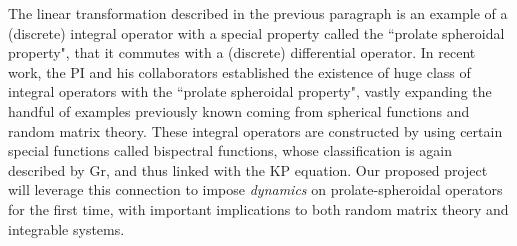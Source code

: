 \documentclass[11pt,letterpaper]{article}
\theoremstyle{definition}
\newcommand{\Gr}{\text{Gr}}
\begin{document}
\begin{enumerate}[]
The linear transformation described in the previous paragraph is an example of a (discrete) integral operator with a special property called the ``prolate spheroidal property", that it commutes with a (discrete) differential operator.
In recent work, the PI and his collaborators established the existence of huge class of integral operators with the ``prolate spheroidal property", vastly expanding the handful of examples previously known coming from spherical functions and random matrix theory.
These integral operators are constructed by using certain special functions called bispectral functions, whose classification is again described by $\Gr$, and thus linked with the KP equation.
Our proposed project will leverage this connection to impose \emph{dynamics} on prolate-spheroidal operators for the first time, with important implications to both random matrix theory and integrable systems.

\end{enumerate}
\end{document}
